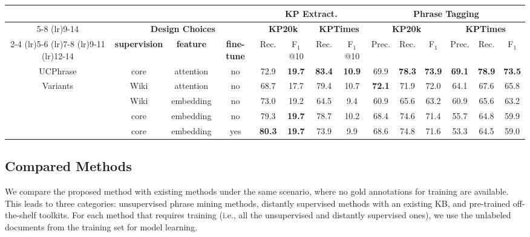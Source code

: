 \documentclass[sigconf]{acmart}
\newcommand{\our}{\mbox{UCPhrase}\xspace}
\newcommand{\ie}{\mbox{i.e.}\xspace}
\newcommand{\smtx}[1]{\scriptsize{#1}}
\begin{document}
\begin{table*}[]
    \renewcommand\arraystretch{.8}
    \centering
\caption{Ablation study of \our model variants ($\%$).}
    \label{tab:ablation}
    \small
    \begin{tabular}{cccc cccc cccccc}
    \toprule
    & & & & \multicolumn{4}{c}{\textbf{KP Extract.}} &  \multicolumn{6}{c}{\textbf{Phrase Tagging}}  \\
    \cmidrule(lr){5-8} \cmidrule(lr){9-14}
    & \multicolumn{3}{c}{\textbf{Design Choices}} & \multicolumn{2}{c}{\textbf{KP20k}} & \multicolumn{2}{c}{\textbf{KPTimes}} & \multicolumn{3}{c}{\textbf{KP20k}} & \multicolumn{3}{c}{\textbf{KPTimes}} \\
    \cmidrule(lr){2-4} \cmidrule(lr){5-6} \cmidrule(lr){7-8} \cmidrule(lr){9-11} \cmidrule(lr){12-14}
    & \textbf{supervision} & \textbf{feature} & \textbf{fine-tune} & Rec. & F$_1$\smtx{@10} & Rec. & F$_1$\smtx{@10} & Prec. & Rec. & F$_1$  & Prec. & Rec. & F$_1$ \\
    \midrule
    \our & core & attention & no  & 72.9 & \textbf{19.7} & \textbf{83.4} & \textbf{10.9} & 69.9 & \textbf{78.3} & \textbf{73.9} & \textbf{69.1} & \textbf{78.9} & \textbf{73.5}  \\
    \midrule
    \multirow{4}{*}{Variants}& Wiki & attention & no & 68.7 & 17.7 & 79.4 & 10.7 & \textbf{72.1} & 71.9 & 72.0 & 64.1 & 67.6 & 65.8 \\
    & Wiki & embedding & no & 73.0 & 19.2 & 64.5 & 9.4 & 60.9 & 65.6 & 63.2 & 60.9 & 65.6 & 63.2 \\
    & core & embedding & no & 79.3 & \textbf{19.7} & 78.7 & 10.2 & 68.4 & 74.6 & 71.4 & 55.7 & 64.8 & 59.9 \\
    & core & embedding & yes & \textbf{80.3} & \textbf{19.7} & 73.9 & 9.9 & 68.6 & 74.8 & 71.6 & 53.3 & 64.5 & 59.0 \\
\bottomrule
    \end{tabular}
    \vspace{-3mm}
\end{table*}

 



\subsection{Compared Methods}
\label{sec:compared-methods}
We compare the proposed method with existing methods under the same scenario, where no gold annotations for training are available.
This leads to three categories: unsupervised phrase mining methods, distantly supervised methods with an existing KB, and pre-trained off-the-shelf toolkits.
For each method that requires training (\ie, all the unsupervised and distantly supervised ones), we use the unlabeled documents from the training set for model learning.
\end{document}
